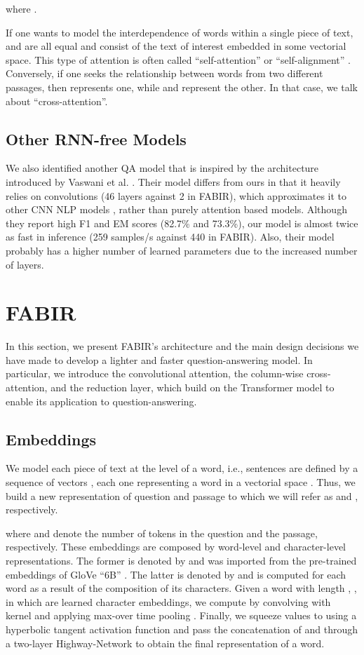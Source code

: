 \documentclass[conference, letterpaper, 10pt]{IEEEtran}
\begin{document}
where .

If one wants to model the interdependence of words within a single piece of text,  and  are all equal and consist of the text of interest embedded in some vectorial space. This type of attention is often called {``}self-attention{''} or {``}self-alignment{''} \cite{Vaswani,Seo2016}. Conversely, if one seeks the relationship between words from two different passages, then  represents one, while  and  represent the other. In that case, we talk about {``}cross-attention{''}.

\subsection{Other RNN-free Models}
We also identified another QA model \cite{anony-nonRNN} that is inspired by the architecture introduced by Vaswani et al. \cite{Vaswani}. Their model differs from ours in that it heavily relies on convolutions (46 layers against 2 in FABIR), which approximates it to other CNN NLP models \cite{GehringAGYD17}, rather than purely attention based models.
Although they report high F1 and EM scores (82.7\% and 73.3\%), our model is almost twice as fast in inference (259 samples/s against 440 in FABIR). Also, their model probably has a higher number of learned parameters due to the increased number of layers.

\section{FABIR}
In this section, we present FABIR's architecture and the main design decisions we have made to develop a lighter and faster question-answering model. In particular, we introduce the convolutional attention, the column-wise cross-attention, and the reduction layer, which build on the Transformer model \cite{Vaswani} to enable its application to question-answering.

\subsection{Embeddings}
We model each piece of text at the level of a word, i.e., sentences are defined by a sequence of vectors , each one representing a word in a vectorial space . 
Thus, we build a new representation of question and passage to which we will refer as  and , respectively. 


where  and  denote the number of tokens in the question and the passage, respectively.
These embeddings are composed by word-level and character-level representations. The former is denoted by  and was imported from the pre-trained embeddings of GloVe {``}6B{''} \cite{Pennington2014}. The latter is denoted by  and is computed for each word as a result of the composition of its characters. 
Given a word with length , , in which  are learned character embeddings, we compute  by convolving  with kernel  and applying max-over time pooling \cite{kim2016character}.
Finally, we squeeze  values to  using a hyperbolic tangent activation function and pass the concatenation of  and  through a two-layer Highway-Network \cite{Srivastava2015} to obtain the final representation of a word.
\end{document}
